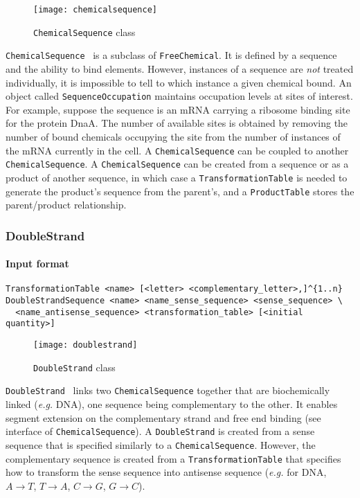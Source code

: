 \begin{figure}[!h]
  \centering
  \texttt{[image: chemicalsequence]}
  \caption{\texttt{ChemicalSequence} class}
\label{fig:chemical_sequence}
\end{figure}

\texttt{ChemicalSequence}~ is a subclass of \texttt{FreeChemical}.
It is defined by a sequence and the ability to bind elements.
However, instances of a sequence are \emph{not} treated individually,
it is impossible to tell to which instance a given chemical bound.
An object called \texttt{SequenceOccupation} maintains occupation levels at sites of interest.
For example, suppose the sequence is an mRNA carrying a ribosome binding site for the protein DnaA.
The number of available sites is obtained by removing the number of bound chemicals
occupying the site from the number of instances of the mRNA currently in the cell.
A \texttt{ChemicalSequence} can be coupled to another \texttt{ChemicalSequence}.
A \texttt{ChemicalSequence} can be created from a sequence or as a product of another sequence,
in which case a \texttt{TransformationTable} is needed to generate the product's sequence from the parent's,
and a \texttt{ProductTable} stores the parent/product relationship.

\subsubsection{DoubleStrand}

\paragraph{Input format}
\begin{verbatim}
TransformationTable <name> [<letter> <complementary_letter>,]^{1..n}
DoubleStrandSequence <name> <name_sense_sequence> <sense_sequence> \
  <name_antisense_sequence> <transformation_table> [<initial quantity>]
\end{verbatim}

\begin{figure}[!h]
  \centering
  \texttt{[image: doublestrand]}
  \caption{\texttt{DoubleStrand} class}
\label{fig:double_strand}
\end{figure}

\texttt{DoubleStrand}~ links two \texttt{ChemicalSequence}
together that are biochemically linked (\textit{e.g.} DNA), one sequence being complementary to the other.
It enables segment extension on the complementary strand and free end binding
(see interface of \texttt{ChemicalSequence}).
A \texttt{DoubleStrand} is created from a sense sequence that is specified similarly
to a \texttt{ChemicalSequence}.
However, the complementary sequence is created from a \texttt{TransformationTable}
that specifies how to transform the sense sequence into antisense sequence
(\textit{e.g.} for DNA, $A\rightarrow T$, $T\rightarrow A$, $C\rightarrow G$, $G\rightarrow C$).


